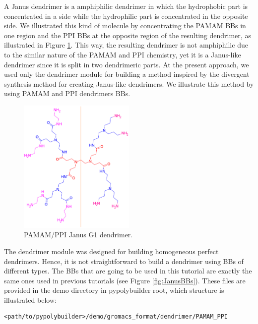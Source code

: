 
A Janus dendrimer is a amphiphilic dendrimer in which the hydrophobic part is concentrated in a side while the hydrophilic part is concentrated in the opposite side.
We illustrated this kind of molecule by concentrating the PAMAM BBs in one region and the PPI BBs at the opposite region of the resulting dendrimer, as illustrated in Figure \ref{fig:JanusG1}.
This way, the resulting dendrimer is not amphiphilic due to the similar nature of the PAMAM and PPI chemistry, yet it is a Janus-like dendrimer since it is split in two dendrimeric parts.
At the present approach, we used only the dendrimer module for building a method inspired by the divergent synthesis method for creating Janus-like dendrimers.
We illustrate this method by using PAMAM and PPI dendrimers BBs.

\begin{figure}
    \centering
    \includegraphics[width=0.5\textwidth]{PAMAM_PPI-Janus/JANUSG1.png}
    \caption{PAMAM/PPI Janus G1 dendrimer.}
    \label{fig:JanusG1}
\end{figure}

The dendrimer module was designed for building homogeneous perfect dendrimers.
Hence, it is not straightforward to build a dendrimer using BBs of different types.
The BBs that are going to be used in this tutorial are exactly the same ones used in previous tutorials (see Figure \ref{fig:JanusBBs}).
These files are provided in the demo directory in pypolybuilder root, which structure is illustrated below:
\begin{lstlisting}
<path/to/pypolybuilder>/demo/gromacs_format/dendrimer/PAMAM_PPI
\end{lstlisting}

